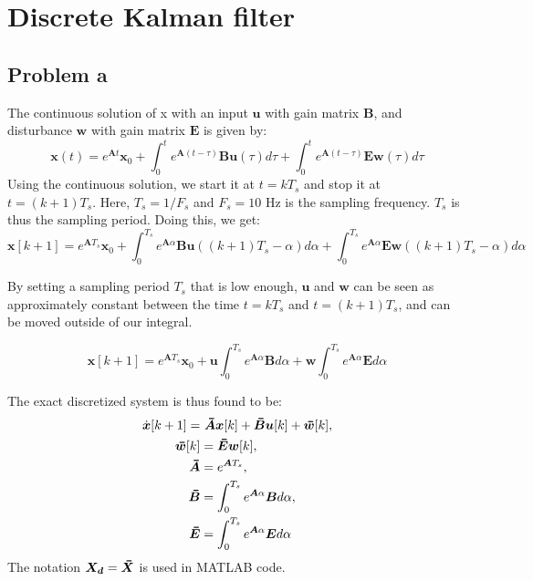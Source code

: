 \section{Discrete Kalman filter}
\subsection{Problem a}
The continuous solution of x with an input $\bm{u}$ with gain matrix $\bm{B}$, and disturbance $\bm{w}$ with gain matrix $\bm{E}$ is given by:
\begin{equation*}
\bm{x}(t) = e^{\bm{A}t}\bm{x}_0 + \int_0^te^{\bm{A}(t-\tau)}\bm{Bu}(\tau)d\tau + \int_0^te^{\bm{A}(t-\tau)}\bm{Ew}(\tau)d\tau
\end{equation*}
Using the continuous solution, we start it at $t=kT_s$ and stop it at $t=(k+1)T_s$. Here, $T_s = 1/F_s$ and $F_s = 10$ Hz is the sampling frequency. $T_s$ is thus the sampling period. Doing this, we get:
\begin{equation}
\bm{x}[k+1] = e^{\bm{A}T_s}\bm{x}_0 + \int_0^{T_s} e^{\bm{A}\alpha}\bm{Bu}((k+1)T_s -\alpha)d\alpha + \int_0^{T_s} e^{\bm{A}\alpha}\bm{Ew}((k+1)T_s -\alpha)d\alpha \label{x_disc}
\end{equation}

By setting a sampling period $T_s$ that is low enough, $\bm{u}$ and $\bm{w}$ can be seen as approximately constant between the time $t = kT_s$ and $t = (k+1)T_s$, and can be moved outside of our integral.

\begin{equation}
\bm{x}[k+1] = e^{\bm{A}T_s}\bm{x}_0 + \bm{u}\int_0^{T_s} e^{\bm{A}\alpha}\bm{B}d\alpha + \bm{w}\int_0^{T_s} e^{\bm{A}\alpha}\bm{E}d\alpha \label{x_disc_const}
\end{equation}

The exact discretized system is thus found to be:
\begin{subequations}
\begin{align}
    \dot{\bm{x}}[k+1] =& \ \thickbar{\bm{A}}\bm{x}[k]+\thickbar{\bm{B}}\bm{u}[k] + \thickbar{\bm{w}}[k], \\
    \thickbar{\bm{w}}[k] &= \thickbar{\bm{E}}\bm{w}[k], \label{w_bar} \\
    \thickbar{\bm{A}} &= e^{\bm{A}T_s}, \\
    \thickbar{\bm{B}} &= \int_{0}^{T_s}e^{\bm{A}\alpha}\bm{B}d\alpha \label{B_d}, \\
    \thickbar{\bm{E}} &= \int_{0}^{T_s}e^{\bm{A}\alpha}\bm{E}d\alpha \label{E_d}
\end{align}
\end{subequations}
The notation $\bm{X_d} = \thickbar{\bm{X}}$ is used in MATLAB code.

